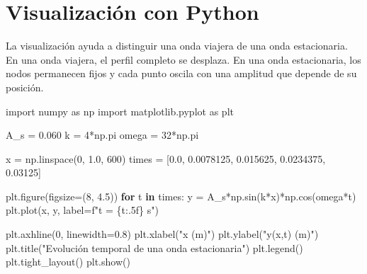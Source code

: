 \documentclass[
  letterpaper,
  DIV=11,
  numbers=noendperiod]{scrreprt}
\newenvironment{Shaded}{\begin{snugshade}}{\end{snugshade}}
\newcommand{\ControlFlowTok}[1]{\textcolor[rgb]{0.00,0.23,0.31}{\textbf{#1}}}
\newcommand{\DecValTok}[1]{\textcolor[rgb]{0.68,0.00,0.00}{#1}}
\newcommand{\FloatTok}[1]{\textcolor[rgb]{0.68,0.00,0.00}{#1}}
\newcommand{\ImportTok}[1]{\textcolor[rgb]{0.00,0.46,0.62}{#1}}
\newcommand{\KeywordTok}[1]{\textcolor[rgb]{0.00,0.23,0.31}{\textbf{#1}}}
\newcommand{\NormalTok}[1]{\textcolor[rgb]{0.00,0.23,0.31}{#1}}
\newcommand{\OperatorTok}[1]{\textcolor[rgb]{0.37,0.37,0.37}{#1}}
\newcommand{\SpecialCharTok}[1]{\textcolor[rgb]{0.37,0.37,0.37}{#1}}
\newcommand{\SpecialStringTok}[1]{\textcolor[rgb]{0.13,0.47,0.30}{#1}}
\newcommand{\StringTok}[1]{\textcolor[rgb]{0.13,0.47,0.30}{#1}}
\begin{document}
\section{Visualización con Python}\label{visualizaciuxf3n-con-python}

La visualización ayuda a distinguir una onda viajera de una onda
estacionaria. En una onda viajera, el perfil completo se desplaza. En
una onda estacionaria, los nodos permanecen fijos y cada punto oscila
con una amplitud que depende de su posición.

\begin{Shaded}
\begin{Highlighting}[]
\ImportTok{import}\NormalTok{ numpy }\ImportTok{as}\NormalTok{ np}
\ImportTok{import}\NormalTok{ matplotlib.pyplot }\ImportTok{as}\NormalTok{ plt}

\NormalTok{A\_s }\OperatorTok{=} \FloatTok{0.060}
\NormalTok{k }\OperatorTok{=} \DecValTok{4}\OperatorTok{*}\NormalTok{np.pi}
\NormalTok{omega }\OperatorTok{=} \DecValTok{32}\OperatorTok{*}\NormalTok{np.pi}

\NormalTok{x }\OperatorTok{=}\NormalTok{ np.linspace(}\DecValTok{0}\NormalTok{, }\FloatTok{1.0}\NormalTok{, }\DecValTok{600}\NormalTok{)}
\NormalTok{times }\OperatorTok{=}\NormalTok{ [}\FloatTok{0.0}\NormalTok{, }\FloatTok{0.0078125}\NormalTok{, }\FloatTok{0.015625}\NormalTok{, }\FloatTok{0.0234375}\NormalTok{, }\FloatTok{0.03125}\NormalTok{]}

\NormalTok{plt.figure(figsize}\OperatorTok{=}\NormalTok{(}\DecValTok{8}\NormalTok{, }\FloatTok{4.5}\NormalTok{))}
\ControlFlowTok{for}\NormalTok{ t }\KeywordTok{in}\NormalTok{ times:}
\NormalTok{    y }\OperatorTok{=}\NormalTok{ A\_s}\OperatorTok{*}\NormalTok{np.sin(k}\OperatorTok{*}\NormalTok{x)}\OperatorTok{*}\NormalTok{np.cos(omega}\OperatorTok{*}\NormalTok{t)}
\NormalTok{    plt.plot(x, y, label}\OperatorTok{=}\SpecialStringTok{f"t = }\SpecialCharTok{\{}\NormalTok{t}\SpecialCharTok{:.5f\}}\SpecialStringTok{ s"}\NormalTok{)}

\NormalTok{plt.axhline(}\DecValTok{0}\NormalTok{, linewidth}\OperatorTok{=}\FloatTok{0.8}\NormalTok{)}
\NormalTok{plt.xlabel(}\StringTok{"x (m)"}\NormalTok{)}
\NormalTok{plt.ylabel(}\StringTok{"y(x,t) (m)"}\NormalTok{)}
\NormalTok{plt.title(}\StringTok{"Evolución temporal de una onda estacionaria"}\NormalTok{)}
\NormalTok{plt.legend()}
\NormalTok{plt.tight\_layout()}
\NormalTok{plt.show()}
\end{Highlighting}
\end{Shaded}
\end{document}
